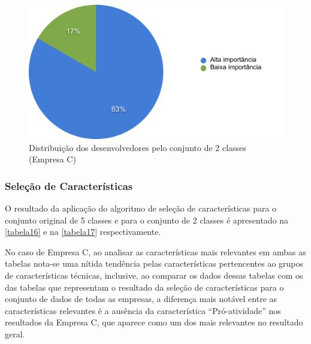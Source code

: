 \begin{figure}[h]
	\centering
	\includegraphics[scale=0.45]{figs/empresa_c/imagem-classe-alternativa}
	\caption{\label{fig_16}Distribuição dos desenvolvedores pelo conjunto de 2 classes (Empresa C)}
\end{figure}

\subsubsection{Seleção de Características}
O resultado da aplicação do algoritmo de seleção de características para o conjunto original de 5 classes e para o conjunto de 2 classes é apresentado na \autoref{tabela16} e na \autoref{tabela17} respectivamente.

No caso de Empresa C, ao analisar as características mais relevantes em ambas as tabelas nota-se uma nítida tendência pelas características pertencentes ao grupos de características técnicas, inclusive, ao comparar os dados dessas tabelas com os das tabelas que representam o resultado da seleção de características para o conjunto de dados de todas as empresas, a diferença mais notável entre as características relevantes é a ausência da característica ``Pró-atividade'' nos resultados da Empresa C, que aparece como um dos mais relevantes no resultado geral.

